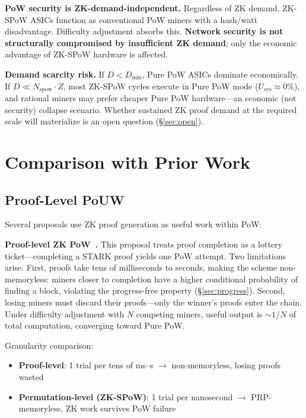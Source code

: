 \documentclass[11pt,a4paper]{article}
\begin{document}
\textbf{PoW security is ZK-demand-independent.} Regardless of ZK demand, ZK-SPoW ASICs function as conventional PoW miners with a hash/watt disadvantage. Difficulty adjustment absorbs this. \textbf{Network security is not structurally compromised by insufficient ZK demand}; only the economic advantage of ZK-SPoW hardware is affected.

\textbf{Demand scarcity risk.} If $D < D_{\min}$, Pure PoW ASICs dominate economically. If $D \ll N_{\mathrm{spow}} \cdot Z$, most ZK-SPoW cycles execute in Pure PoW mode ($U_{\mathrm{sys}} \approx 0\%$), and rational miners may prefer cheaper Pure PoW hardware---an economic (not security) collapse scenario. Whether sustained ZK proof demand at the required scale will materialize is an open question (\S\ref{sec:open}).

\section{Comparison with Prior Work}
\label{sec:comparison}

\subsection{Proof-Level PoUW}

Several proposals use ZK proof generation as useful work within PoW:

\textbf{Proof-level ZK PoW~\cite{oleksak2025}.} This proposal treats proof completion as a lottery ticket---completing a STARK proof yields one PoW attempt. Two limitations arise. First, proofs take tens of milliseconds to seconds, making the scheme non-memoryless: miners closer to completion have a higher conditional probability of finding a block, violating the progress-free property (\S\ref{sec:progress}). Second, losing miners must discard their proofs---only the winner's proofs enter the chain. Under difficulty adjustment with $N$ competing miners, useful output is ${\sim}1/N$ of total computation, converging toward Pure PoW.

Granularity comparison:
\begin{itemize}
\item \textbf{Proof-level}: 1 trial per tens of ms--s $\to$ non-memoryless, losing proofs wasted
\item \textbf{Permutation-level (ZK-SPoW)}: 1 trial per nanosecond $\to$ PRP-memoryless, ZK work survives PoW failure
\end{itemize}
\end{document}
